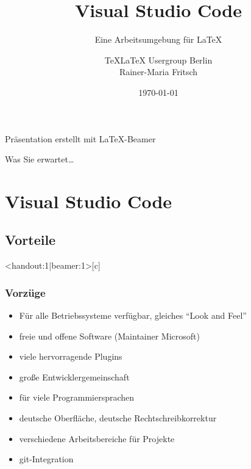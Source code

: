 \documentclass[t, %
							xcolor=dvipsnames,%
							hyperref={bookmarks,colorlinks},%
							]%
							{beamer}
\title[Kurzer Titel]{Visual Studio Code}
\subtitle[]{Eine Arbeitsumgebung für \LaTeX}
\author[RMF]{TeXLaTeX Usergroup Berlin\\\small{Rainer-Maria Fritsch}}
\date[\today]{\today}
\begin{document}
	\begin{frame}{}
		\maketitle
		\begin{center} 
			\tiny{Präsentation erstellt mit {\LaTeX}-Beamer} 
		\end{center}
		
	\end{frame}
	
	\begin{frame}{Was Sie erwartet\ldots}
		\setcounter{tocdepth}{1}
		\tableofcontents
	\end{frame}
	
	\AtBeginSection[]{
		\begin{frame}
		\setcounter{tocdepth}{2}
		\tableofcontents[currentsection]
    \end{frame}
	}
  
  \section{Visual Studio Code}
  \label{sec:VisualStudioCode}
    \subsection{Vorteile}
		\label{sub:Vorteile}
		\begin{frame}<handout:1|beamer:1>[c]
			\frametitle{Vorzüge}
			\begin{itemize}
				\item Für alle Betriebssysteme verfügbar, gleiches \enquote{Look and Feel}
				\item freie und offene Software (Maintainer Microsoft)
				\item viele hervorragende Plugins
				\item große Entwicklergemeinschaft
				\item für viele Programmiersprachen
				\item deutsche Oberfläche, deutsche Rechtschreibkorrektur
				\item verschiedene Arbeitsbereiche für Projekte
				\item git-Integration
			\end{itemize}
		\end{frame}
		
\end{document}
